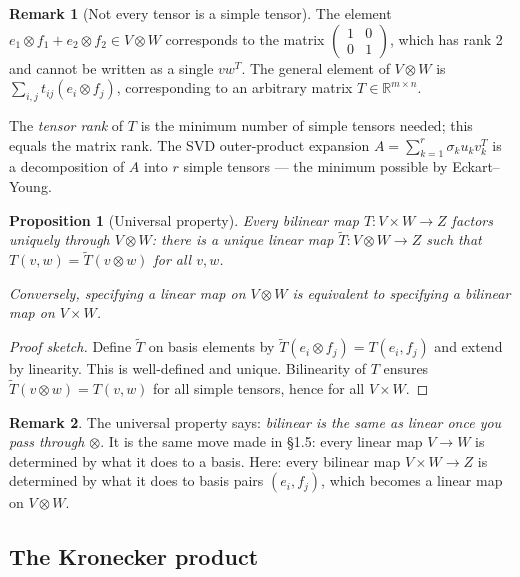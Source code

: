 \documentclass[11pt]{article}
\theoremstyle{definition}
\newtheorem{remark}{Remark}[section]
\theoremstyle{plain}
\newtheorem{proposition}{Proposition}[section]
\begin{document}
\begin{remark}[Not every tensor is a simple tensor]
  The element $e_1\otimes f_1 + e_2\otimes f_2\in V\otimes W$ corresponds
  to the matrix $\begin{pmatrix}1&0\\0&1\end{pmatrix}$, which has rank 2
  and cannot be written as a single $vw^T$.  The general element of
  $V\otimes W$ is $\sum_{i,j}t_{ij}(e_i\otimes f_j)$, corresponding to an
  arbitrary matrix $T\in\mathbb{R}^{m\times n}$.

  The \emph{tensor rank} of $T$ is the minimum number of simple tensors
  needed; this equals the matrix rank.  The SVD outer-product expansion
  $A = \sum_{k=1}^r \sigma_k u_k v_k^T$ is a decomposition of $A$ into
  $r$ simple tensors --- the minimum possible by Eckart--Young.
\end{remark}

\begin{proposition}[Universal property]
  Every bilinear map $T: V\times W\to Z$ factors uniquely through
  $V\otimes W$: there is a unique linear map $\tilde T: V\otimes W\to Z$
  such that $T(v,w) = \tilde T(v\otimes w)$ for all $v,w$.

  Conversely, specifying a linear map on $V\otimes W$ is equivalent to
  specifying a bilinear map on $V\times W$.
\end{proposition}
\begin{proof}[Proof sketch]
  Define $\tilde T$ on basis elements by
  $\tilde T(e_i\otimes f_j) = T(e_i,f_j)$ and extend by linearity.
  This is well-defined and unique.  Bilinearity of $T$ ensures
  $\tilde T(v\otimes w) = T(v,w)$ for all simple tensors, hence
  for all $V\times W$.
\end{proof}

\begin{remark}
  The universal property says: \emph{bilinear is the same as linear once
  you pass through $\otimes$}.  It is the same move made in \S1.5:
  every linear map $V\to W$ is determined by what it does to a basis.
  Here: every bilinear map $V\times W\to Z$ is determined by what it
  does to basis pairs $(e_i,f_j)$, which becomes a linear map on
  $V\otimes W$.
\end{remark}

\subsection{The Kronecker product}
\end{document}
